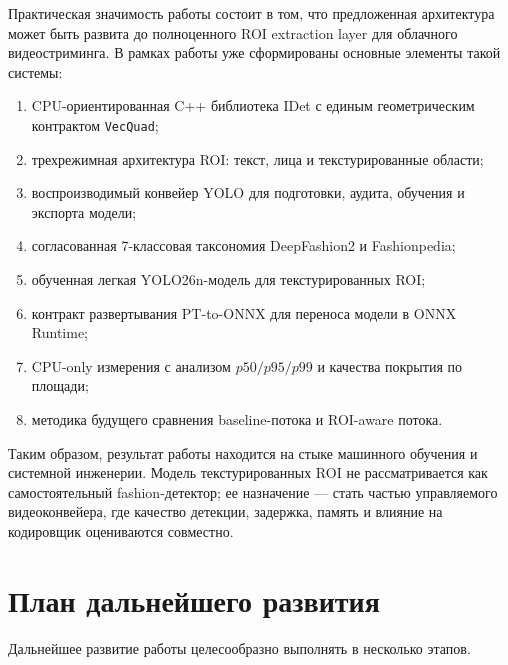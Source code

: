 \documentclass[12pt,a4paper,oneside,openany]{report}
\begin{document}
Практическая значимость работы состоит в том, что предложенная архитектура может быть развита до полноценного ROI extraction layer для облачного видеостриминга. В рамках работы уже сформированы основные элементы такой системы:
\begin{enumerate}[label=\arabic*)]
\item CPU-ориентированная C++ библиотека IDet с единым геометрическим контрактом \texttt{VecQuad};
\item трехрежимная архитектура ROI: текст, лица и текстурированные области;
\item воспроизводимый конвейер YOLO для подготовки, аудита, обучения и экспорта модели;
\item согласованная 7-классовая таксономия DeepFashion2 и Fashionpedia;
\item обученная легкая YOLO26n-модель для текстурированных ROI;
\item контракт развертывания PT-to-ONNX для переноса модели в ONNX Runtime;
\item CPU-only измерения с анализом $p50/p95/p99$ и качества покрытия по площади;
\item методика будущего сравнения baseline-потока и ROI-aware потока.
\end{enumerate}

Таким образом, результат работы находится на стыке машинного обучения и системной инженерии. Модель текстурированных ROI не рассматривается как самостоятельный fashion-детектор; ее назначение --- стать частью управляемого видеоконвейера, где качество детекции, задержка, память и влияние на кодировщик оцениваются совместно.


\section{План дальнейшего развития}

Дальнейшее развитие работы целесообразно выполнять в несколько этапов.
\end{document}
